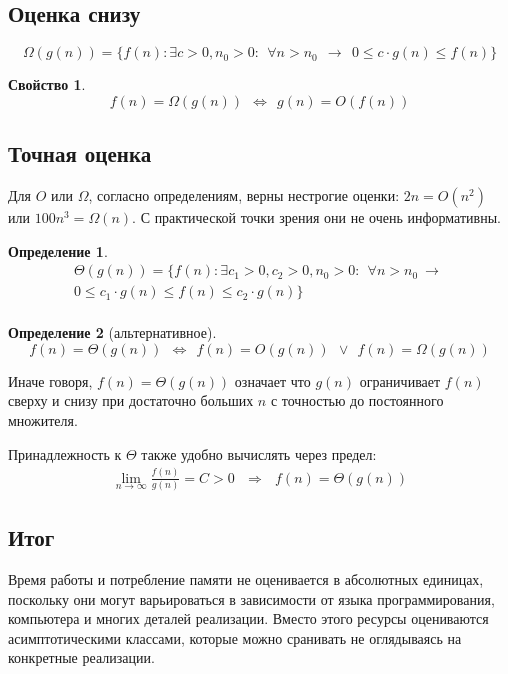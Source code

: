 \documentclass[12pt,a4paper]{report}
\newtheorem*{definition}{Определение}
\newtheorem*{property}{Свойство}
\begin{document}
\subsection*{Оценка снизу}

$$
\Omega(g(n)) = \{f(n) : \exists c>0, n_0>0:~~ \forall n > n_0 ~~\to~~ 0 \leqslant c \cdot g(n) \leqslant f(n)\}
$$

\begin{property}
$$
f(n) = \Omega(g(n))   ~~\Leftrightarrow~~  g(n) = O(f(n))
$$
\end{property}


\subsection*{Точная оценка}

Для $O$ или $\Omega$, согласно определениям, верны нестрогие оценки: $2n = O(n^2)$ или $100n^3 = \Omega(n)$. С практической точки зрения они не очень информативны.

\begin{definition}
$$
  \begin{gathered}
  \Theta(g(n)) = \{f(n) : \exists c_1>0, c_2>0, n_0>0:~~ \forall n > n_0 ~\to~\\
  0 \leqslant c_1 \cdot g(n) \leqslant f(n) \leqslant c_2 \cdot g(n)\} \\
  \end{gathered}
$$
\end{definition}

\begin{definition}[альтернативное]
$$
  f(n) = \Theta(g(n)) ~~\Leftrightarrow~~  f(n) = O(g(n)) ~~\vee~~ f(n) = \Omega(g(n))
$$
\end{definition}

Иначе говоря, $f(n)=\Theta(g(n))$ означает что $g(n)$ ограничивает $f(n)$ сверху и снизу при достаточно больших $n$ с точностью до постоянного множителя.

Принадлежность к $\Theta$ также удобно вычислять через предел:
$$
\begin{gathered}
\lim_{n\to\infty} \frac{f(n)}{g(n)} = C > 0   ~~~\Rightarrow~~~   f(n) = \Theta(g(n))
\end{gathered}
$$

\subsection*{Итог}

Время работы и потребление памяти не оценивается в абсолютных единицах, поскольку они могут варьироваться в зависимости от языка программирования, компьютера и многих деталей реализации. Вместо этого ресурсы оцениваются асимптотическими классами, которые можно сранивать не оглядываясь на конкретные реализации.
\end{document}
